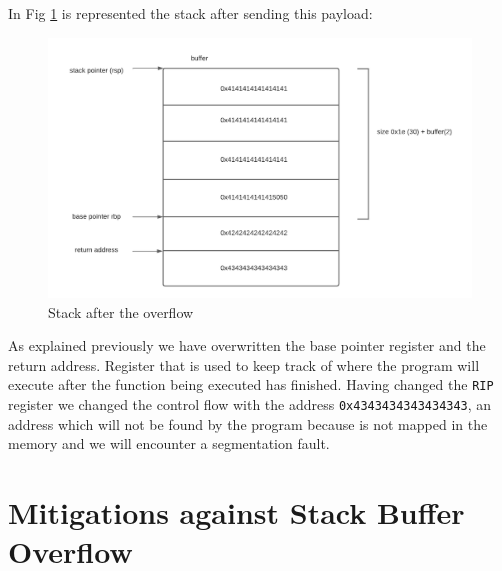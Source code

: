     In Fig \ref{fig:stack w overflow}  is represented the stack after sending this payload:
    \begin{figure}[htbp]
        \centering
        \includegraphics[width=0.8\linewidth]{Images/stack_after_overflow.png}
        \caption{Stack after the overflow}
        \label{fig:stack w overflow}
    \end{figure}
    As explained previously we have overwritten the base pointer register and the return address.\newline
    Register that is used to keep track of where the program will execute after the function being executed has finished.\newline
    Having changed the \texttt{RIP} register we changed the control flow with the address \texttt{0x4343434343434343}, an address which will not be found by the program because is not mapped in the memory and we will encounter a segmentation fault.\newline

    \clearpage
    \section{Mitigations against Stack Buffer Overflow}
